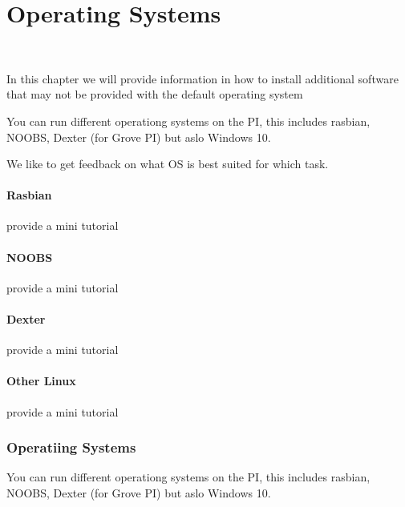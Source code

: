 \chapter{Operating Systems}

\FILENAME\

In this chapter we will provide information in how to install additional software that may not be provided with the default operating system

You can run different operationg systems on the PI, this includes 
rasbian, NOOBS, Dexter (for Grove PI) but aslo Windows 10.

We like to get feedback on what OS is best suited for which task.

\subsubsection{Rasbian}

\begin{exercise}
provide a mini tutorial 
\end{exercise}

\subsubsection{NOOBS}

\begin{exercise}
provide a mini tutorial 
\end{exercise}

\subsubsection{Dexter}

\begin{exercise}
provide a mini tutorial 
\end{exercise}

\subsubsection{Other Linux}

\begin{exercise}
provide a mini tutorial 
\end{exercise}

\subsection{Operatiing Systems}

You can run different operationg systems on the PI, this includes 
rasbian, NOOBS, Dexter (for Grove PI) but aslo Windows 10.

